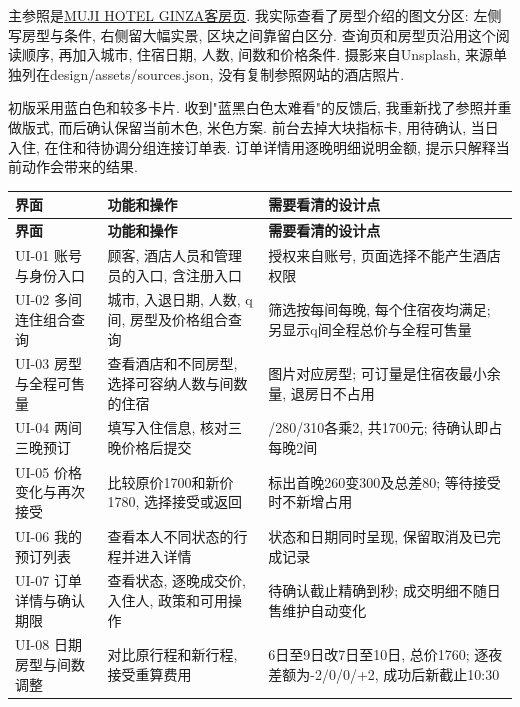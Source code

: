 \documentclass[cn,nofont,11pt,a4paper]{elegantpaper}
\begin{document}
主参照是\href{https://hotel.muji.com/ginza/en/rooms/}{MUJI HOTEL GINZA客房页}. 我实际查看了房型介绍的图文分区: 左侧写房型与条件, 右侧留大幅实景, 区块之间靠留白区分. 查询页和房型页沿用这个阅读顺序, 再加入城市, 住宿日期, 人数, 间数和价格条件. 摄影来自Unsplash, 来源单独列在design/assets/sources.json, 没有复制参照网站的酒店照片.

初版采用蓝白色和较多卡片. 收到"蓝黑白色太难看"的反馈后, 我重新找了参照并重做版式, 而后确认保留当前木色, 米色方案. 前台去掉大块指标卡, 用待确认, 当日入住, 在住和待协调分组连接订单表. 订单详情用逐晚明细说明金额, 提示只解释当前动作会带来的结果.

\begingroup\small\setlength{\tabcolsep}{4pt}\renewcommand{\arraystretch}{1.28}
\begin{longtable}{>{\RaggedRight\arraybackslash}p{}>{\RaggedRight\arraybackslash}p{}>{\RaggedRight\arraybackslash}p{}}
\toprule
\bfseries 界面 & \bfseries 功能和操作 & \bfseries 需要看清的设计点 \\
\midrule\endfirsthead
\toprule
\bfseries 界面 & \bfseries 功能和操作 & \bfseries 需要看清的设计点 \\
\midrule\endhead
\midrule\multicolumn{3}{r}{\footnotesize 续下页}\endfoot
\bottomrule\endlastfoot
UI-01 账号与身份入口 & 顾客, 酒店人员和管理员的入口, 含注册入口 & 授权来自账号, 页面选择不能产生酒店权限 \\
UI-02 多间连住组合查询 & 城市, 入退日期, 人数, q间, 房型及价格组合查询 & 筛选按每间每晚, 每个住宿夜均满足; 另显示q间全程总价与全程可售量 \\
UI-03 房型与全程可售量 & 查看酒店和不同房型, 选择可容纳人数与间数的住宿 & 图片对应房型; 可订量是住宿夜最小余量, 退房日不占用 \\
UI-04 两间三晚预订 & 填写入住信息, 核对三晚价格后提交 & 260/\allowbreak{}280/\allowbreak{}310各乘2, 共1700元; 待确认即占每晚2间 \\
UI-05 价格变化与再次接受 & 比较原价1700和新价1780, 选择接受或返回 & 标出首晚260变300及总差80; 等待接受时不新增占用 \\
UI-06 我的预订列表 & 查看本人不同状态的行程并进入详情 & 状态和日期同时呈现, 保留取消及已完成记录 \\
UI-07 订单详情与确认期限 & 查看状态, 逐晚成交价, 入住人, 政策和可用操作 & 待确认截止精确到秒; 成交明细不随日售维护自动变化 \\
UI-08 日期房型与间数调整 & 对比原行程和新行程, 接受重算费用 & 6日至9日改7日至10日, 总价1760; 逐夜差额为-2/\allowbreak{}0/\allowbreak{}0/\allowbreak{}+2, 成功后新截止10:30 \\

\end{longtable}
\end{document}
